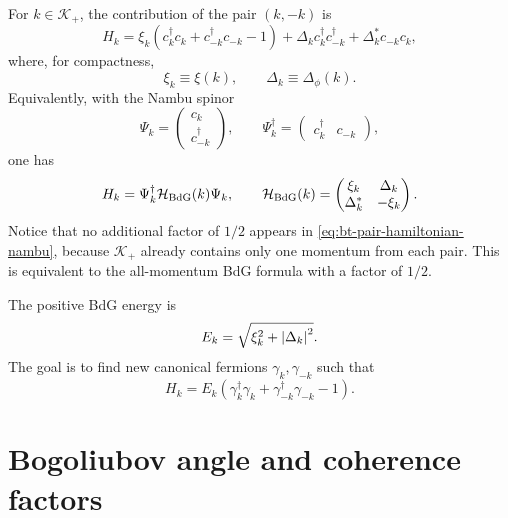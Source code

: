 For $k\in\mathcal{K}_+$, the contribution of the pair $(k,-k)$ is
\begin{equation}
\label{eq:bt-pair-hamiltonian}
    H_k
    =
    \xi_k\left(c_k^\dagger c_k+c_{-k}^\dagger c_{-k}-1\right)
    +\Delta_k c_k^\dagger c_{-k}^\dagger
    +\Delta_k^*c_{-k}c_k,
\end{equation}
where, for compactness,
\begin{equation}
    \xi_k\equiv \xi(k),
    \qquad
    \Delta_k\equiv \Delta_\phi(k).
\end{equation}
Equivalently, with the Nambu spinor
\begin{equation}
\label{eq:bt-nambu-spinor-positive-k}
    \Psi_k
    =
    \begin{pmatrix}
        c_k\\
        c_{-k}^\dagger
    \end{pmatrix},
    \qquad
    \Psi_k^\dagger
    =
    \begin{pmatrix}
        c_k^\dagger&c_{-k}
    \end{pmatrix},
\end{equation}
one has
\begin{equation}
\label{eq:bt-pair-hamiltonian-nambu}
    H_k=\Psi_k^\dagger\mathcal{H}_{\rm BdG}(k)\Psi_k,
    \qquad
    \mathcal{H}_{\rm BdG}(k)
    =
    \begin{pmatrix}
        \xi_k&\Delta_k\\
        \Delta_k^*&-\xi_k
    \end{pmatrix}.
\end{equation}
Notice that no additional factor of $1/2$ appears in
\cref{eq:bt-pair-hamiltonian-nambu}, because $\mathcal{K}_+$ already contains
only one momentum from each pair.  This is equivalent to the all-momentum BdG
formula with a factor of $1/2$.

The positive BdG energy is
\begin{equation}
\label{eq:bt-positive-energy}
    E_k
    =
    \sqrt{\xi_k^2+\left|\Delta_k\right|^2}.
\end{equation}
The goal is to find new canonical fermions $\gamma_k,\gamma_{-k}$ such that
\begin{equation}
\label{eq:bt-diagonal-goal}
    H_k
    =
    E_k\left(\gamma_k^\dagger\gamma_k+
    \gamma_{-k}^\dagger\gamma_{-k}-1\right).
\end{equation}

\section{Bogoliubov angle and coherence factors}
\label{sec:bt-coherence-factors}

